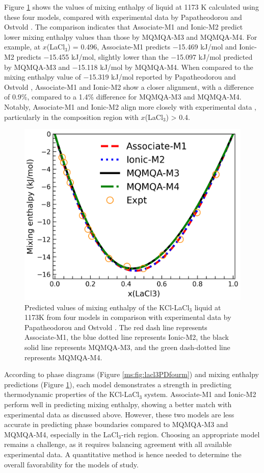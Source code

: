 Figure \ref{ms:fig:lacl3HMRfourm} shows the values of mixing enthalpy of liquid at 1173 K calculated using these four models, compared with experimental data by Papatheodorou and Ostvold \cite{papatheodorou1974thermodynamic}. The comparison indicates that Associate-M1 and Ionic-M2 predict lower mixing enthalpy values than those by MQMQA-M3 and MQMQA-M4. For example, at $x$(LaCl$_3$) = 0.496, Associate-M1 predicts $-$15.469 kJ/mol and Ionic-M2 predicts $-$15.455 kJ/mol, slightly lower than the $-$15.097 kJ/mol predicted by MQMQA-M3 and $-$15.118 kJ/mol by MQMQA-M4. When compared to the mixing enthalpy value of $-$15.319 kJ/mol reported by Papatheodorou and Ostvold  \cite{papatheodorou1974thermodynamic}, Associate-M1 and Ionic-M2 show a closer alignment, with a difference of 0.9\%, compared to a 1.4\% difference for MQMQA-M3 and MQMQA-M4. Notably, Associate-M1 and Ionic-M2 align more closely with experimental data \cite{papatheodorou1974thermodynamic}, particularly in the composition region with $x$(LaCl$_3$) > 0.4. 

\begin{figure} [H]
    \centering
    \includegraphics[width=0.5\linewidth]{moltensalts/Moltensalts-LaCl3-HMR-FourModels.png}
    \caption{Predicted values of mixing enthalpy of the KCl-LaCl$_3$ liquid at 1173K from four models in comparison with experimental data by Papatheodorou and Ostvold \cite{papatheodorou1974thermodynamic}. The red dash line represents Associate-M1, the blue dotted line represents Ionic-M2, the black solid line represents MQMQA-M3, and the green dash-dotted line represents MQMQA-M4.}
    \label{ms:fig:lacl3HMRfourm}
\end{figure}

According to phase diagrams (Figure \ref{ms:fig:lacl3PDfourm}) and mixing enthalpy predictions (Figure \ref{ms:fig:lacl3HMRfourm}), each model demonstrates a strength in predicting thermodynamic properties of the KCl-LaCl$_3$ system. Associate-M1 and Ionic-M2 perform well in predicting mixing enthalpy, showing a better match with experimental data as discussed above. However, these two models are less accurate in predicting phase boundaries compared to MQMQA-M3 and MQMQA-M4, especially in the LaCl$_3$-rich region. Choosing an appropriate model remains a challenge, as it requires balancing agreement with all available experimental data. A quantitative method is hence needed to determine the overall favorability for the models of study.

